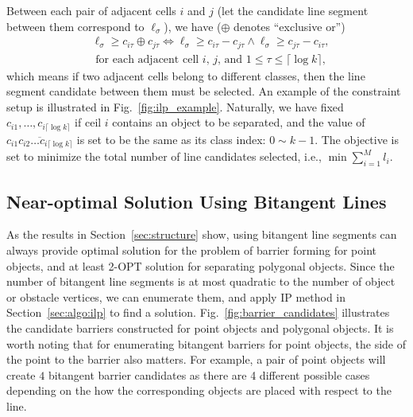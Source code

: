 Between each pair of adjacent cells $i$ and $ j$ (let the candidate line segment between them correspond to $\ell_\sigma$), we have ($\oplus$ denotes ``exclusive or'')
\begin{equation}
\begin{split}
    &\ell_\sigma \geq c_{i\tau} \oplus c_{j\tau}  \Leftrightarrow \ell_\sigma \geq c_{i\tau} - c_{j\tau} \wedge \ell_\sigma\geq c_{j\tau} - c_{i\tau}, \\
    &\text{  for each adjacent cell $i$, $j$, and $1\leq \tau \leq \lceil \log k \rceil$},
\end{split}
\end{equation}
which means if two adjacent cells belong to different classes, then the line segment candidate between them must be selected. An example of the constraint setup is illustrated in Fig.~\ref{fig:ilp_example}.
Naturally, we have fixed $c_{i1},\dots,c_{i\lceil \log k\rceil}$ if ceil $i$ contains an object to be separated, and the value of $\overline{c_{i1}c_{i2}\dots c_{i\lceil \log k\rceil}}$ is set to be the same as its class index: $0\sim k-1$.
The objective is set to minimize the total number of line candidates selected, i.e., $\min \sum_{i=1}^{M} l_i$.

\subsection{Near-optimal Solution Using Bitangent Lines}
As the results in Section~\ref{sec:structure} show, using bitangent line segments 
can always provide optimal solution for the problem of barrier forming for point objects, 
and at least 2-OPT
solution for separating polygonal objects. 
Since the number of bitangent line segments is at 
most quadratic to the number of object or obstacle vertices, 
we can enumerate them, and apply IP method in Section~\ref{sec:algo:ilp} to find a solution. Fig.~\ref{fig:barrier_candidates} illustrates the candidate barriers constructed for point objects and polygonal objects.
It is worth noting that for enumerating bitangent barriers for point objects, the side of the point to the barrier also matters. For example, a pair of point objects will create $4$ bitangent barrier candidates as there are 4 different possible cases depending on the how the corresponding objects are placed with respect to the line. 

